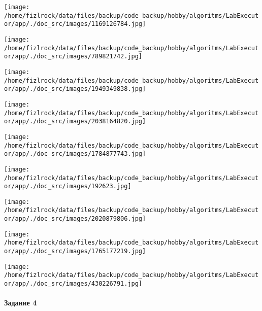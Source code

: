 \documentclass[a4paper, 12pt]{article}
\begin{document}
\texttt{[image: /home/fizlrock/data/files/backup/code\_backup/hobby/algoritms/LabExecutor/app/./doc\_src/images/1169126784.jpg]}

\texttt{[image: /home/fizlrock/data/files/backup/code\_backup/hobby/algoritms/LabExecutor/app/./doc\_src/images/789821742.jpg]}

\texttt{[image: /home/fizlrock/data/files/backup/code\_backup/hobby/algoritms/LabExecutor/app/./doc\_src/images/1949349838.jpg]}

\texttt{[image: /home/fizlrock/data/files/backup/code\_backup/hobby/algoritms/LabExecutor/app/./doc\_src/images/2038164820.jpg]}

\texttt{[image: /home/fizlrock/data/files/backup/code\_backup/hobby/algoritms/LabExecutor/app/./doc\_src/images/1784877743.jpg]}

\texttt{[image: /home/fizlrock/data/files/backup/code\_backup/hobby/algoritms/LabExecutor/app/./doc\_src/images/192623.jpg]}

\texttt{[image: /home/fizlrock/data/files/backup/code\_backup/hobby/algoritms/LabExecutor/app/./doc\_src/images/2020879806.jpg]}

\texttt{[image: /home/fizlrock/data/files/backup/code\_backup/hobby/algoritms/LabExecutor/app/./doc\_src/images/1765177219.jpg]}

\texttt{[image: /home/fizlrock/data/files/backup/code\_backup/hobby/algoritms/LabExecutor/app/./doc\_src/images/430226791.jpg]}
\pagebreak
\paragraph{Задание 4}
\end{document}
